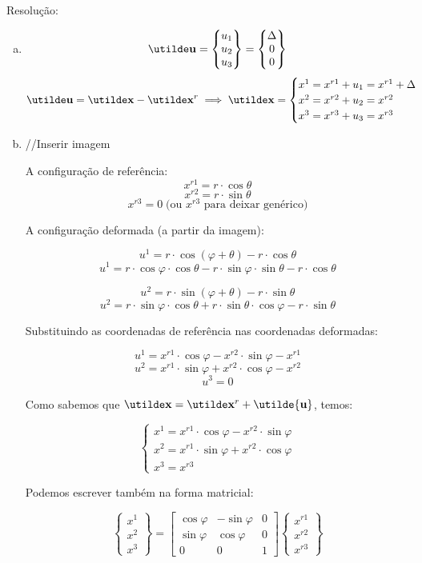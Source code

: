 Resolução:
	
\begin{enumerate}[a)]
	\item
		\[
		\vt{u}=
			\begin{Bmatrix}
			u_1 \\ u_2 \\ u_3
			\end{Bmatrix}
			=
			\begin{Bmatrix}
				\Delta \\ 0 \\ 0
			\end{Bmatrix}
		\]
		\[\vt{u}=\vt{x}-\vt{x}^r
		\implies
		\vt{x}=
		\begin{cases} x^1=x^{r1}+u_1=x^{r1}+\Delta \\ x^2=x^{r2}+u_2=x^{r2} \\ x^3=x^{r3}+u_3=x^{r3}
		\end{cases}
		\]
	\item
		//Inserir imagem
			
		A configuração de referência:
		\[x^{r1}=r\cdot \cos\theta\]
		\[x^{r2}=r\cdot\sin\theta\]
		\[x^{r3}=0\;\text{(ou }x^{r3}\text{ para deixar genérico})\]
			
		A configuração deformada (a partir da imagem):
			
		\[u^1=r\cdot\cos(\varphi+\theta)-r\cdot\cos\theta\]
		\[u^1=r\cdot\cos\varphi\cdot\cos\theta-r\cdot\sin\varphi\cdot\sin\theta-r\cdot\cos\theta\]
			
		\[u^2=r\cdot\sin(\varphi+\theta)-r\cdot\sin\theta\]
		\[u^2=r\cdot\sin\varphi\cdot\cos\theta+r\cdot\sin\theta\cdot\cos\varphi-r\cdot\sin\theta\]
			
		Substituindo as coordenadas de referência nas coordenadas deformadas:

		\[u^1=x^{r1}\cdot\cos\varphi-x^{r2}\cdot\sin\varphi-x^{r1}\]
		\[u^2=x^{r1}\cdot\sin\varphi+x^{r2}\cdot\cos\varphi-x^{r2}\]
		\[u^3=0\]
			
		Como sabemos que $\vt{x}=\vt{x}^r+\utilde{\mathbf{u}}$, temos:
			
		\[
			\begin{cases}
				x^1=x^{r1}\cdot\cos\varphi-x^{r2}\cdot\sin\varphi \\ x^2=x^{r1}\cdot\sin\varphi+x^{r2}\cdot\cos\varphi \\ x^3=x^{r3}
			\end{cases}
		\]
			
		Podemos escrever também na forma matricial:
			
		\[
			\begin{Bmatrix}
				x^1 \\ x^2 \\ x^3
			\end{Bmatrix}
			=
			\begin{bmatrix}	
				\cos\varphi & -\sin\varphi & 0 \\
				\sin\varphi & \cos\varphi & 0 \\
				0 & 0 & 1
			\end{bmatrix}
			\begin{Bmatrix}
				x^{r1} \\ x^{r2} \\ x^{r3}
			\end{Bmatrix}							
		\]
\end{enumerate}